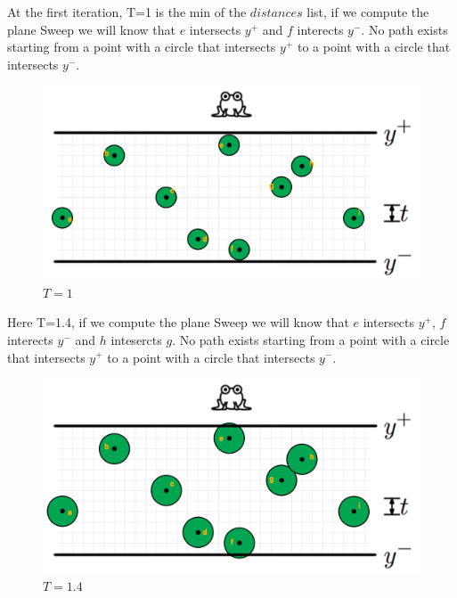 \documentclass[12pt]{article}
\begin{document}
\noindent At the first iteration, T=1 is the min of the $distances$ list, if we compute the plane Sweep we will know that $e$ intersects $y^+$ and $f$ interects $y^-$. No path exists starting from a point with a circle that intersects $y^+$ to a point with a circle that intersects $y^-$.
\begin{figure}[H]
	\centering
	\includegraphics[scale=0.3]{img/problem2-T1.png}
	\caption{$T=1$} \label{fig:1b}
\end{figure}

\newpage
\noindent Here T=1.4, if we compute the plane Sweep we will know that $e$ intersects $y^+$, $f$ interects $y^-$ and $h$ intesercts $g$. No path exists starting from a point with a circle that intersects $y^+$ to a point with a circle that intersects $y^-$.
\begin{figure}[H]
	\centering
	\includegraphics[scale=0.3]{img/problem2-T1_4.png}
	\caption{$T=1.4$} \label{fig:1c}
\end{figure}
\end{document}

